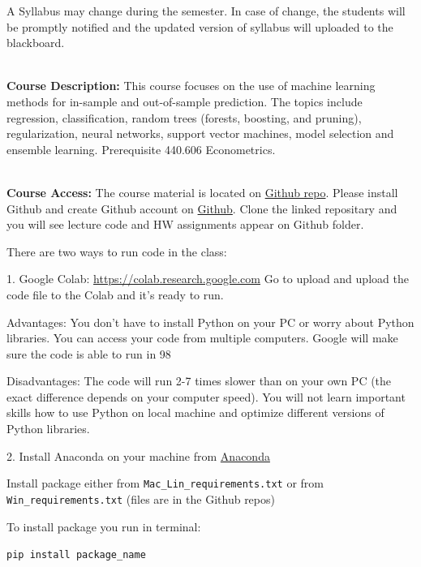 \documentclass[11pt]{article}
\begin{document}
\vspace{5mm}
\begin{center} A Syllabus may change during the semester. In case of change, the students will be promptly notified and the updated version of syllabus will uploaded to the blackboard.   \\
\end{center}



\textbf{\large \\ Course Description:} This course focuses on the use of machine learning methods for in-sample and out-of-sample prediction. The topics include regression, classification, random trees (forests, boosting, and pruning), regularization, neural networks, support vector machines, model selection and ensemble learning. Prerequisite 440.606 Econometrics.

\textbf{\large \\ Course Access:} The course material is located on \href{https://github.com/Rahkovsky/ml_stat_class}{Github repo}. Please install Github and create Github account on \href{https://github.com}{Github}. Clone the linked repositary and you will see lecture code and HW assignments appear on Github folder. 

There are two ways to run code in the class:

1. Google Colab: \href{https://colab.research.google.com}{https://colab.research.google.com} Go to upload and upload the code file to the Colab and it's ready to run.

Advantages: You don't have to install Python on your PC or worry about Python libraries. You can access your code from multiple computers. Google will make sure the code is able to run in 98%

Disadvantages: The code will run 2-7 times slower than on your own PC (the exact difference depends on your computer speed). You will not learn important skills how to use Python on local machine and optimize different versions of Python libraries. 

2. Install Anaconda on your machine from \href{https://www.anaconda.com/products/individual}{Anaconda}

Install package either from \texttt{Mac\_Lin\_requirements.txt} or from \texttt{Win\_requirements.txt} (files are in the Github repos)

To install package you run in terminal:

\texttt{pip install package\_name}
\end{document}
